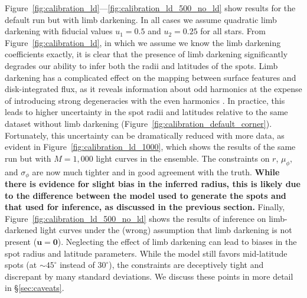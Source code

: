 \documentclass[modern,linenumbers]{aastex62}
\begin{document}
Figure~\ref{fig:calibration_ld}---\ref{fig:calibration_ld_500_no_ld}
show results for the default run but with limb darkening. In all cases
we assume quadratic limb darkening with fiducial values $u_1 = 0.5$
and $u_2 = 0.25$ for all stars. From Figure~\ref{fig:calibration_ld}, in which we
assume we know the limb darkening coefficients exactly, it is clear that
the presence of limb darkening significantly degrades our ability to
infer both the radii and latitudes of the spots. Limb darkening has a complicated
effect on the mapping between surface features and disk-integrated flux, as it
reveals information about odd harmonics at
the expense of introducing strong degeneracies with the even harmonics
. In practice, this leads to higher uncertainty in
the spot radii and latitudes relative to the same dataset without limb
darkening (Figure~\ref{fig:calibration_default_corner}). Fortunately,
this uncertainty can be dramatically reduced with more data, as evident
in Figure~\ref{fig:calibration_ld_1000}, which shows the results of the
same run but with $M=1{,}000$ light curves in the ensemble. The constraints
on $r$, $\mu_\phi$, and $\sigma_\phi$ are now much tighter and in
good agreement with the truth. \textbf{While there is evidence for slight bias
    in the inferred radius, this is likely due to the difference between the model
    used to generate the spots and that used for inference, as discussed in the
    previous section.}
Finally, Figure~\ref{fig:calibration_ld_500_no_ld}
shows the results of inference on limb-darkened light curves under the
(wrong) assumption that limb darkening is not present ($\mathbf{u} = \mathbf{0}$).
Neglecting the effect of limb darkening can lead to biases in the spot radius
and latitude parameters. While the model still favors mid-latitude spots
(at $\sim 45^\circ$ instead of $30^\circ$), the constraints are deceptively tight
and discrepant by many standard deviations. We discuss these points in
more detail in \S\ref{sec:caveats}.
\end{document}
